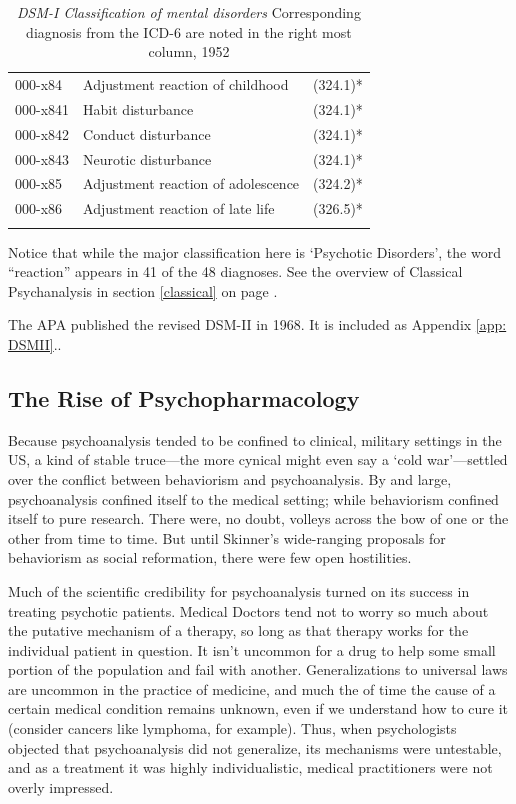 \begin{refsection}
\begin{longtable}[!t]{ | p{2cm} | p{8.8cm} | p{2cm} | }
     000-x84&     Adjustment reaction of childhood&(324.1)* \\
         000-x841&          Habit disturbance&(324.1)* \\
         000-x842&          Conduct disturbance&(324.1)* \\
         000-x843&          Neurotic disturbance&(324.1)* \\
     000-x85&     Adjustment reaction of adolescence&(324.2)* \\
     000-x86&     Adjustment reaction of late life&(326.5)* \\ \hline
\caption{\emph{DSM-I Classification of mental disorders} Corresponding diagnosis from the ICD-6 are noted in the right most column, 1952}
\label{table: 1952Classification}
\end{longtable}


Notice that while the major classification here is `Psychotic Disorders', the word ``reaction'' appears in 41 of the 48 diagnoses. See the overview of Classical Psychanalysis in section \ref{classical} on page \pageref{classical}.

The APA published the revised DSM-II in 1968. It is included as Appendix \ref{app: DSMII}..

\subsection{The Rise of Psychopharmacology}
\label{theriseofpsychopharmacology}

Because psychoanalysis tended to be confined to clinical, military settings in the US, a kind of stable truce---the more cynical might even say a `cold war'---settled over the conflict between behaviorism and psychoanalysis. By and large, psychoanalysis confined itself to the medical setting; while behaviorism confined itself to pure research. There were, no doubt, volleys across the bow of one or the other from time to time. But until Skinner's wide-ranging proposals for behaviorism as social reformation, there were few open hostilities.

Much of the scientific credibility for psychoanalysis turned on its success in treating psychotic patients. Medical Doctors tend not to worry so much about the putative mechanism of a therapy, so long as that therapy works for the individual patient in question. It isn't uncommon for a drug to help some small portion of the population and fail with another. Generalizations to universal laws are uncommon in the practice of medicine, and much the of time the cause of a certain medical condition remains unknown, even if we understand how to cure it (consider cancers like lymphoma, for example). Thus, when psychologists objected that psychoanalysis did not generalize, its mechanisms were untestable, and as a treatment it was highly individualistic, medical practitioners were not overly impressed. 


\end{refsection}
